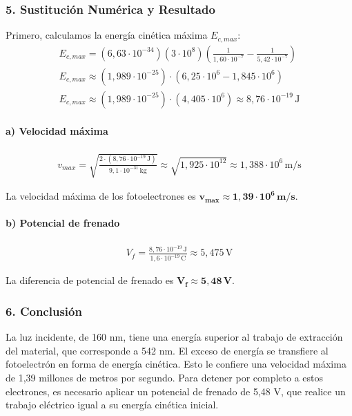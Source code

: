 \subsubsection*{5. Sustitución Numérica y Resultado}
Primero, calculamos la energía cinética máxima $E_{c,max}$:
\begin{gather}
    E_{c,max} = (6,63\cdot10^{-34})(3\cdot10^8)\left(\frac{1}{1,60\cdot10^{-7}} - \frac{1}{5,42\cdot10^{-7}}\right) \nonumber \\
    E_{c,max} \approx (1,989\cdot10^{-25}) \cdot (6,25\cdot10^6 - 1,845\cdot10^6) \nonumber \\
    E_{c,max} \approx (1,989\cdot10^{-25}) \cdot (4,405\cdot10^6) \approx 8,76 \cdot 10^{-19}\,\text{J}
\end{gather}

\paragraph*{a) Velocidad máxima}
\begin{gather}
    v_{max} = \sqrt{\frac{2 \cdot (8,76 \cdot 10^{-19}\,\text{J})}{9,1\cdot10^{-31}\,\text{kg}}} \approx \sqrt{1,925 \cdot 10^{12}} \approx 1,388 \cdot 10^6\,\text{m/s}
\end{gather}
\begin{cajaresultado}
    La velocidad máxima de los fotoelectrones es $\boldsymbol{v_{max} \approx 1,39 \cdot 10^6\,\textbf{m/s}}$.
\end{cajaresultado}

\paragraph*{b) Potencial de frenado}
\begin{gather}
    V_f = \frac{8,76 \cdot 10^{-19}\,\text{J}}{1,6\cdot10^{-19}\,\text{C}} \approx 5,475\,\text{V}
\end{gather}
\begin{cajaresultado}
    La diferencia de potencial de frenado es $\boldsymbol{V_f \approx 5,48\,\textbf{V}}$.
\end{cajaresultado}

\subsubsection*{6. Conclusión}
\begin{cajaconclusion}
La luz incidente, de 160 nm, tiene una energía superior al trabajo de extracción del material, que corresponde a 542 nm. El exceso de energía se transfiere al fotoelectrón en forma de energía cinética. Esto le confiere una velocidad máxima de 1,39 millones de metros por segundo. Para detener por completo a estos electrones, es necesario aplicar un potencial de frenado de 5,48 V, que realice un trabajo eléctrico igual a su energía cinética inicial.
\end{cajaconclusion}

